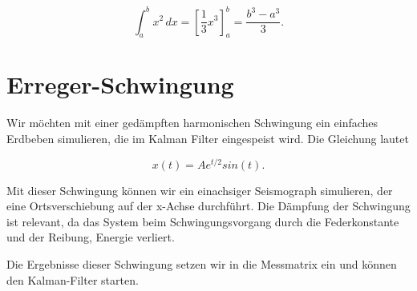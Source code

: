 \documentclass[11pt,a4paper]{article}
\begin{document}
\begin{equation}
\int_a^b x^2\, dx
=
\left[ \frac13 x^3 \right]_a^b
=
\frac{b^3-a^3}3.
\label{erdbeben:equation1}
\end{equation}

\section{Erreger-Schwingung}
Wir möchten mit einer gedämpften harmonischen Schwingung ein einfaches Erdbeben simulieren, die im Kalman Filter eingespeist wird.
Die Gleichung lautet

\begin{equation}
x(t)=Ae^{t/2}sin(t).
\end{equation}

Mit dieser Schwingung können wir ein einachsiger Seismograph simulieren, der eine Ortsverschiebung auf der x-Achse durchführt.
Die Dämpfung der Schwingung ist relevant, da das System beim Schwingungsvorgang durch die Federkonstante und der Reibung, Energie verliert.

Die Ergebnisse dieser Schwingung setzen wir in die Messmatrix ein und können den Kalman-Filter starten.
\end{document}

